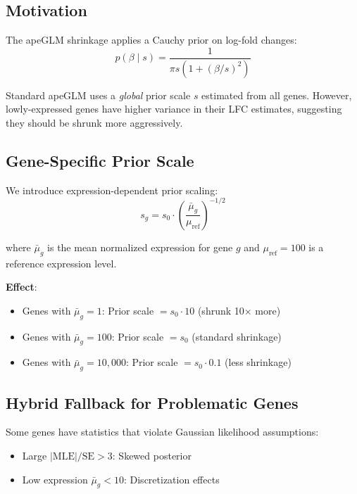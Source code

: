 \documentclass[11pt]{article}
\theoremstyle{definition}
\theoremstyle{remark}
\begin{document}
\subsection{Motivation}

The apeGLM shrinkage applies a Cauchy prior on log-fold changes:
\begin{equation}
p(\beta \mid s) = \frac{1}{\pi s \left(1 + (\beta/s)^2\right)}
\end{equation}

Standard apeGLM uses a \emph{global} prior scale $s$ estimated from all genes. However, lowly-expressed genes have higher variance in their LFC estimates, suggesting they should be shrunk more aggressively.

\subsection{Gene-Specific Prior Scale}

We introduce expression-dependent prior scaling:
\begin{equation}
s_g = s_0 \cdot \left(\frac{\bar{\mu}_g}{\mu_{\text{ref}}}\right)^{-1/2}
\end{equation}

where $\bar{\mu}_g$ is the mean normalized expression for gene $g$ and $\mu_{\text{ref}} = 100$ is a reference expression level.

\textbf{Effect}: 
\begin{itemize}
    \item Genes with $\bar{\mu}_g = 1$: Prior scale $= s_0 \cdot 10$ (shrunk 10$\times$ more)
    \item Genes with $\bar{\mu}_g = 100$: Prior scale $= s_0$ (standard shrinkage)
    \item Genes with $\bar{\mu}_g = 10{,}000$: Prior scale $= s_0 \cdot 0.1$ (less shrinkage)
\end{itemize}

\subsection{Hybrid Fallback for Problematic Genes}

Some genes have statistics that violate Gaussian likelihood assumptions:
\begin{itemize}
    \item Large $|\text{MLE}|/\text{SE} > 3$: Skewed posterior
    \item Low expression $\bar{\mu}_g < 10$: Discretization effects
\end{itemize}
\end{document}
